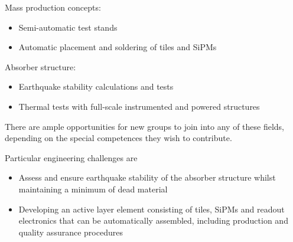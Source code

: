 Mass production concepts:
\begin{itemize}
\item Semi-automatic test stands
\item Automatic placement and soldering of tiles and SiPMs
\end{itemize}

Absorber structure:
\begin{itemize}
\item Earthquake stability calculations and tests
\item Thermal tests with full-scale instrumented and powered structures
\end{itemize}

There are ample opportunities for new groups to join into any of these fields, depending on the special competences they wish to contribute.

Particular engineering challenges are
\begin{itemize}
\item Assess and ensure earthquake stability of the absorber structure whilst maintaining a minimum of dead material
\item Developing an active layer element consisting of tiles, SiPMs and readout electronics that can be automatically assembled, including production and quality assurance procedures
\end{itemize}
